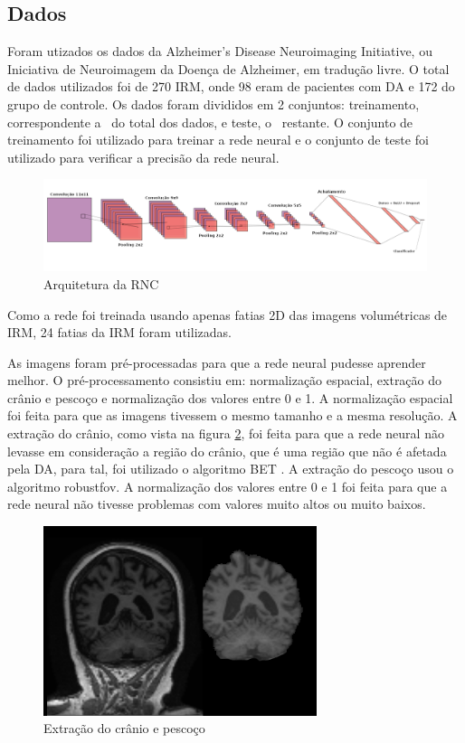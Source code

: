 \documentclass[conference]{IEEEtran}
\begin{document}
\subsection{Dados}

Foram utizados os dados da Alzheimer's Disease Neuroimaging Initiative, ou Iniciativa de Neuroimagem da Doença de Alzheimer, em tradução livre. O total de dados utilizados foi de 270 IRM, onde 98 eram de pacientes com DA e 172 do grupo de controle. Os dados foram divididos em 2 conjuntos: treinamento, correspondente a \textthreequarters ~do total dos dados, e teste, o \textonequarter~restante. O conjunto de treinamento foi utilizado para treinar a rede neural e o conjunto de teste foi utilizado para verificar a precisão da rede neural.

\begin{figure}[ht!]
\centering
\includegraphics[width=16cm]{img/architecture.png}
\caption{Arquitetura da RNC}
\label{fig:arch}
\end{figure}

Como a rede foi treinada usando apenas fatias 2D das imagens volumétricas de IRM, 24 fatias da IRM foram utilizadas.

As imagens foram pré-processadas para que a rede neural pudesse aprender melhor. O pré-processamento consistiu em: normalização espacial, extração do crânio e pescoço e normalização dos valores entre 0 e 1. A normalização espacial foi feita para que as imagens tivessem o mesmo tamanho e a mesma resolução. A extração do crânio, como vista na figura \ref{fig:bet}, foi feita para que a rede neural não levasse em consideração a região do crânio, que é uma região que não é afetada pela DA, para tal, foi utilizado o algoritmo BET \cite{bet}. A extração do pescoço usou o algoritmo robustfov. A normalização dos valores entre 0 e 1 foi feita para que a rede neural não tivesse problemas com valores muito altos ou muito baixos.

\begin{figure}[H]
\centering
\includegraphics[width=8cm]{img/bet.png}
\caption{Extração do crânio e pescoço}
\label{fig:bet}
\end{figure}
\end{document}
